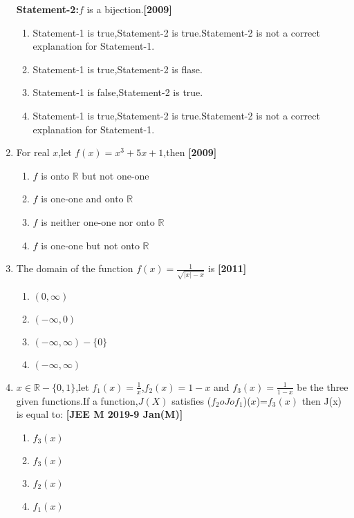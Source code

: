 \documentclass[journal,12pt,twocolumn]{IEEEtran}
\theoremstyle{remark}
\begin{document}
\begin{enumerate}[start=4]
	     \textbf{Statement-2:}$f$ is a bijection.\hfill \textbf{[2009]}
	     \begin{enumerate}
		     \item {\small Statement-1 is true,Statement-2 is true.Statement}-2 is  not a correct explanation for Statement-1.
		     \item Statement-1 is true,Statement-2 is flase.
		     \item Statement-1 is false,Statement-2 is true.
		     \item {\small Statement-1 is true,Statement-2 is true.Statement}-2 is not a correct explanation for Statement-1.
	     \end{enumerate}
     \item For real $x$,let $f(x)=x^{3}+5x+1$,then \hfill \textbf{[2009]}
	     \begin{enumerate}
		     \item $f$ is onto $\mathbb{R}$ but not one-one
		     \item $f$ is one-one and onto $\mathbb{R}$
		     \item $f$ is neither one-one nor onto $\mathbb{R}$
		     \item $f$ is one-one but not onto $\mathbb{R}$
	     \end{enumerate}
     \item The domain of the function $f(x)=\frac{1}{\sqrt{|x|-x}}$ is \hfill \textbf{[2011]}\\
	     \begin{enumerate}
		     \item $(0,\infty)$
		     \item $(-\infty,0)$
		     \item $(-\infty,\infty)-\{0\} $
		     \item $(-\infty,\infty)$
	     \end{enumerate}
	     \pagebreak
     \item $x\in \mathbb{R}-\{0,1\}$,let $f_1(x)=\frac{1}{x}$,$f_2(x)=1-x$ and $f_3(x)=\frac{1}{1-x}$ be the three given functions.If a function,$J(X)$ satisfies ($f_2oJof_1$)($x$)=$f_3(x)$ then J(x) is equal to: \hfill \textbf{[JEE M 2019-9 Jan(M)]}
	     \begin{enumerate}
		     \item $f_3(x)$
		     \item $f_3(x)$
		     \item $f_2(x)$
		     \item $f_1(x)$
	     \end{enumerate}
	

\end{enumerate}
\end{document}
